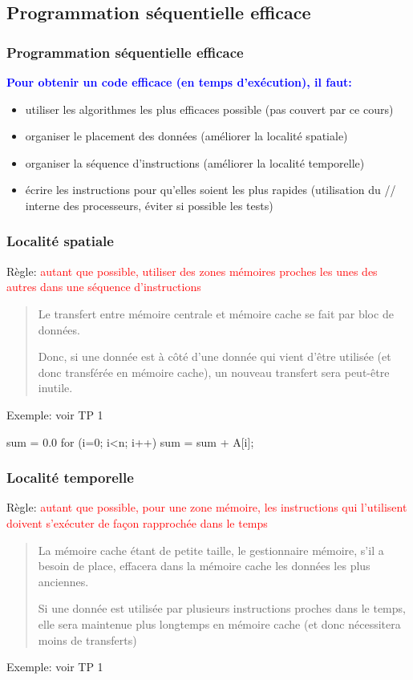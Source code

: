 \documentclass{beamer}
\begin{document}
\begin{frame}
\section{Programmation s\'equentielle efficace}
\frametitle{Programmation s\'equentielle efficace}

\bf
\textcolor{blue}{Pour obtenir un code efficace (en temps d'ex\'ecution), il faut:}

\begin{itemize}
	\item utiliser les algorithmes les plus efficaces possible (pas couvert par ce cours)
	
	\item organiser le placement des donn\'ees (am\'eliorer la localit\'e spatiale)
	
	\item organiser la s\'equence d'instructions (am\'eliorer la localit\'e temporelle)

	\item \'ecrire les instructions pour qu'elles soient les plus rapides (utilisation du // interne des processeurs, \'eviter si possible les tests)
\end{itemize}
\end{frame}

\begin{frame}
\frametitle{Localit\'e spatiale}
Règle:  \textcolor{red}{autant que possible, utiliser des zones m\'emoires proches les unes des autres dans une s\'equence d'instructions}
\begin{quote}
	Le transfert entre m\'emoire centrale et m\'emoire cache se fait par bloc de donn\'ees.
	
	Donc, si une donn\'ee est \`a c\^ot\'e d'une donn\'ee qui vient d'\^etre utilis\'ee (et donc transf\'er\'ee en m\'emoire cache), un nouveau transfert sera peut-\^etre inutile.
\end{quote}

\vfill
Exemple: voir TP 1
\end{frame}

\begin{frame}
sum = 0.0
for (i=0; i<n; i++)
   sum = sum + A[i];
\end{frame}

\begin{frame}
\frametitle{Localit\'e temporelle}
Règle: 
	\textcolor{red}{autant que possible, pour une zone m\'emoire, les instructions qui l'utilisent doivent s'ex\'ecuter de façon rapproch\'ee dans le temps}
	
	\begin{quote}
		La m\'emoire cache \'etant de petite taille, le gestionnaire m\'emoire, s'il a besoin de place, effacera dans la m\'emoire cache les donn\'ees les plus anciennes.
		
		Si une donn\'ee est utilis\'ee par plusieurs instructions proches dans le temps, elle sera maintenue plus longtemps en m\'e\-moi\-re cache (et donc n\'ecessitera moins de transferts)
	\end{quote}
Exemple: voir TP 1
\end{frame}
\end{document}
